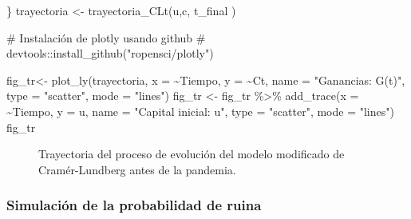 \documentclass[
  us-letterpaper,
]{scrreprt}
\newenvironment{Shaded}{\begin{snugshade}}{\end{snugshade}}
\newcommand{\AttributeTok}[1]{\textcolor[rgb]{0.40,0.45,0.13}{#1}}
\newcommand{\CommentTok}[1]{\textcolor[rgb]{0.37,0.37,0.37}{#1}}
\newcommand{\FunctionTok}[1]{\textcolor[rgb]{0.28,0.35,0.67}{#1}}
\newcommand{\NormalTok}[1]{\textcolor[rgb]{0.00,0.23,0.31}{#1}}
\newcommand{\OtherTok}[1]{\textcolor[rgb]{0.00,0.23,0.31}{#1}}
\newcommand{\SpecialCharTok}[1]{\textcolor[rgb]{0.37,0.37,0.37}{#1}}
\newcommand{\StringTok}[1]{\textcolor[rgb]{0.13,0.47,0.30}{#1}}
\theoremstyle{plain}
\theoremstyle{plain}
\theoremstyle{definition}
\theoremstyle{remark}
\begin{document}
\begin{Shaded}
\begin{Highlighting}[]
\NormalTok{\}}
\NormalTok{trayectoria }\OtherTok{\textless{}{-}} \FunctionTok{trayectoria\_CLt}\NormalTok{(u,c, t\_final )}

\CommentTok{\# Instalación de plotly usando github}
\CommentTok{\# devtools::install\_github("ropensci/plotly")}

\NormalTok{fig\_tr}\OtherTok{\textless{}{-}} \FunctionTok{plot\_ly}\NormalTok{(trayectoria, }\AttributeTok{x =} \SpecialCharTok{\textasciitilde{}}\NormalTok{Tiempo, }\AttributeTok{y =} \SpecialCharTok{\textasciitilde{}}\NormalTok{Ct, }
\AttributeTok{name =} \StringTok{"Ganancias: G(t)"}\NormalTok{, }\AttributeTok{type =} \StringTok{"scatter"}\NormalTok{, }\AttributeTok{mode =} \StringTok{"lines"}\NormalTok{)}
\NormalTok{fig\_tr }\OtherTok{\textless{}{-}}\NormalTok{ fig\_tr }\SpecialCharTok{\%\textgreater{}\%} \FunctionTok{add\_trace}\NormalTok{(}\AttributeTok{x =} \SpecialCharTok{\textasciitilde{}}\NormalTok{Tiempo, }\AttributeTok{y =}\NormalTok{ u,  }
\AttributeTok{name =} \StringTok{"Capital inicial: u"}\NormalTok{, }\AttributeTok{type =} \StringTok{"scatter"}\NormalTok{, }\AttributeTok{mode =} \StringTok{"lines"}\NormalTok{)}
\NormalTok{fig\_tr}
\end{Highlighting}
\end{Shaded}

\begin{figure}


\caption{\label{fig-fig-trayectoriapdf}Trayectoria del proceso de
evolución del modelo modificado de Cramér-Lundberg antes de la
pandemia.}

\end{figure}%

\subsubsection{Simulación de la probabilidad de
ruina}\label{simulaciuxf3n-de-la-probabilidad-de-ruina}
\end{document}

